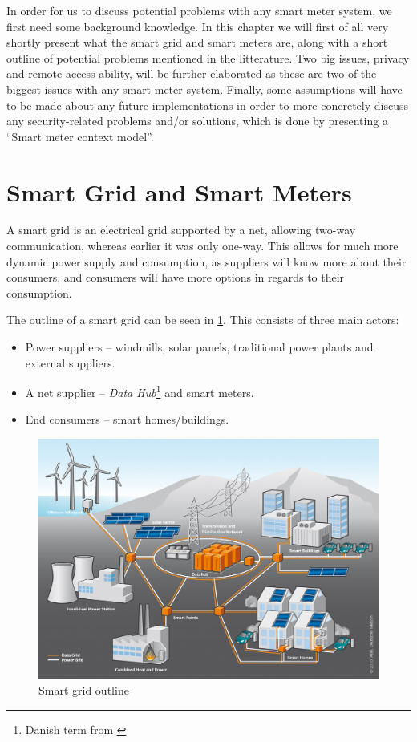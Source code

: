 In order for us to discuss potential problems with any smart meter system, we first need some background knowledge.
In this chapter we will first of all very shortly present what the smart grid and smart meters are, along with a short outline of potential problems mentioned in the litterature.
Two big issues, privacy and remote access-ability, will be further elaborated as these are two of the biggest issues with any smart meter system.
Finally, some assumptions will have to be made about any future implementations in order to more concretely discuss any security-related problems and/or solutions, which is done by presenting a ``Smart meter context model''.

\section{Smart Grid and Smart Meters}\label{smart_grid_smart_meter}
A smart grid is an electrical grid supported by a net, allowing two-way communication, whereas earlier it was only one-way.
This allows for much more dynamic power supply and consumption, as suppliers will know more about their consumers, and consumers will have more options in regards to their consumption.

The outline of a smart grid can be seen in \cref{fig:background:smartgrid}.
This consists of three main actors:

\begin{itemize}
	\item Power suppliers -- windmills, solar panels, traditional power plants and external suppliers.
	\item A net supplier -- \emph{Data Hub}\footnote{Danish term from \cite{LOV_nr_575_af_18-06-2012}} and smart meters.
	\item End consumers -- smart homes/buildings.
\end{itemize}

\begin{figure}[H]
	\includegraphics[width=\textwidth]{figures/SmartGrid_Ueberblick_ohneLegende.jpg}
	\caption{Smart grid outline\protect\footnotemark}
	\label{fig:background:smartgrid}
\end{figure}

